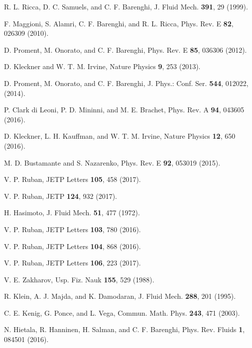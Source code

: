 \documentclass[pra,twocolumn,showpacs]{revtex4}
\begin{document}
\begin{thebibliography}{99}
 R. L. Ricca, D. C. Samuels, and C. F. Barenghi, J. Fluid Mech. {\bf 391}, 29 (1999).

 F. Maggioni, S. Alamri, C. F. Barenghi, and R. L. Ricca, 
Phys. Rev. E {\bf 82}, 026309 (2010).

 D. Proment, M. Onorato, and C. F. Barenghi, 
Phys. Rev. E {\bf 85}, 036306 (2012).

 D. Kleckner and W. T. M. Irvine, Nature Physics {\bf 9}, 253 (2013). 

 D. Proment, M. Onorato, and C. F. Barenghi, 
J. Phys.: Conf. Ser. {\bf 544}, 012022, (2014).

 P. Clark di Leoni, P. D. Mininni, and M. E. Brachet, 
Phys. Rev. A {\bf 94}, 043605 (2016).

 D. Kleckner, L. H. Kauffman, and W. T. M. Irvine, 
Nature  Physics {\bf 12}, 650 (2016).

 M. D. Bustamante and S. Nazarenko, Phys. Rev. E {\bf 92}, 053019 (2015).

 V. P. Ruban, JETP Letters {\bf 105}, 458 (2017).

 V. P. Ruban, JETP {\bf 124}, 932 (2017).

 H. Hasimoto, J. Fluid Mech. {\bf 51}, 477 (1972).

 V. P. Ruban, JETP Letters {\bf 103}, 780 (2016).

 V. P. Ruban, JETP Letters {\bf 104}, 868 (2016).

 V. P. Ruban, JETP Letters {\bf 106}, 223 (2017).

 V. E. Zakharov, Usp. Fiz. Nauk {\bf 155}, 529 (1988).

 R. Klein, A. J. Majda,  and K. Damodaran, J. Fluid Mech. {\bf 288}, 201 (1995).

  C. E. Kenig, G. Ponce, and L. Vega, Commun. Math. Phys. {\bf 243}, 471 (2003).

 N. Hietala, R. Hanninen, H. Salman, and C. F. Barenghi, 
Phys. Rev. Fluids {\bf 1}, 084501 (2016).

\end{thebibliography}
\end{document}
